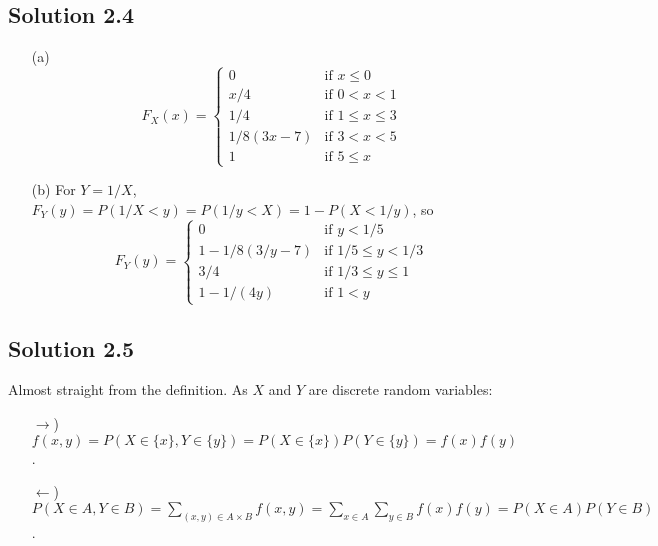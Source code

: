 \subsection*{Solution 2.4}

\begin{itemize}
    \item[(a)]
        \begin{equation*}
            F_X(x) = \left\{ \begin{array}{ll}
                0 & \text{if } x \leq 0 \\
                x/4 & \text{if } 0 < x < 1 \\
                1/4 & \text{if } 1 \leq x \leq 3 \\
                1/8(3x - 7) & \text{if } 3 < x < 5 \\
                1 & \text{if } 5 \leq x
            \end{array} \right.
        \end{equation*}
    \item[(b)] For $Y = 1/X$, $F_Y(y) = P(1/X < y) = P(1/y < X) = 1 - P(X < 1/y)$, so
        \begin{equation*}
            F_Y(y) = \left\{ \begin{array}{ll}
                0 & \text{if } y < 1/5 \\
                1 - 1/8(3/y - 7) & \text{if } 1/5 \leq y < 1/3 \\
                3/4 & \text{if } 1/3 \leq y \leq 1 \\
                1 - 1/(4y) & \text{if } 1 < y
            \end{array} \right.
        \end{equation*}
\end{itemize}


\subsection*{Solution 2.5}

Almost straight from the definition.
As $X$ and $Y$ are discrete random variables:
\begin{itemize}
\item[$\rightarrow$)] $f(x, y) = P(X \in \{x\}, Y \in \{y\}) = P(X \in \{x\})P(Y \in \{y\}) = f(x)f(y)$.
\item[$\leftarrow$)] $P(X \in A, Y \in B) = \sum_{(x, y) \in A \times B} f(x, y) = \sum_{x \in A} \sum_{y \in B} f(x) f(y) = P(X \in A) P(Y \in B)$.
\end{itemize}


